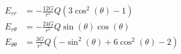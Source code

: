 \documentclass{article}
\begin{document}

\addtocounter{equation}{4}
\begin{align}
    E_{rr} &= - \frac{12 G}{r^{5}} Q \left(3 \cos^{2}{\left (\theta \right )} - 1\right) \\
    E_{r\theta} &= - \frac{24 G}{r^{5}} Q \sin{\left (\theta \right )} \cos{\left (\theta \right )} \\
    E_{\theta\theta} &= \frac{3 G}{r^{5}} Q \left(- \sin^{2}{\left (\theta \right )} + 6 \cos^{2}{\left (\theta \right )} - 2\right)
\end{align}
\end{document}
